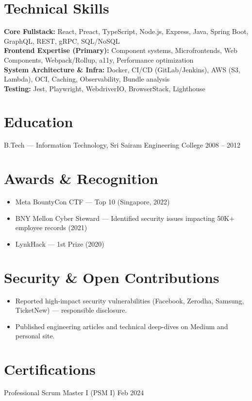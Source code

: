 \documentclass[a4paper,10pt]{article}
\begin{document}
\section{Technical Skills}
\textbf{Core Fullstack:} React, Preact, TypeScript, Node.js, Express, Java, Spring Boot, GraphQL, REST, gRPC, SQL/NoSQL \\
\textbf{Frontend Expertise (Primary):} Component systems, Microfrontends, Web Components, Webpack/Rollup, a11y, Performance optimization \\
\textbf{System Architecture \& Infra:} Docker, CI/CD (GitLab/Jenkins), AWS (S3, Lambda), OCI, Caching, Observability, Bundle analysis \\
\textbf{Testing:} Jest, Playwright, WebdriverIO, BrowserStack, Lighthouse

\section{Education}
B.Tech — Information Technology, Sri Sairam Engineering College \hfill 2008 -- 2012

\section{Awards \& Recognition}
\begin{itemize}
  \item Meta BountyCon CTF — Top 10 (Singapore, 2022)
  \item BNY Mellon Cyber Steward — Identified security issues impacting 50K+ employee records (2021)
  \item LynkHack — 1st Prize (2020)
\end{itemize}

\section{Security \& Open Contributions}
\begin{itemize}
  \item Reported high-impact security vulnerabilities (Facebook, Zerodha, Samsung, TicketNew) — responsible disclosure.
  \item Published engineering articles and technical deep-dives on Medium and personal site.
\end{itemize}

\section{Certifications}
Professional Scrum Master I (PSM I) \hfill Feb 2024
\end{document}
